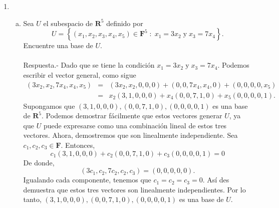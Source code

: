 \begin{enumerate}[\bfseries 1.]
\begin{enumerate}[(a)]
	\end{enumerate}

    \item 
	\begin{enumerate}[a).]

	    \item Sea $U$ el subespacio de $\textbf{R}^5$ definido por
	    $$U=\left\{(x_1,x_2,x_3,x_4,x_5)\in \textbf{F}^5\; : \; x_1=3x_2\;\mbox{y}\; x_3=7x_4\right\}.$$
	    Encuentre una base de $U$.\\\\
		Respuesta.-\; Dado que se tiene la condición $x_1=3x_2\;\mbox{y}\; x_3=7x_4$. Podemos escribir el vector general, como sigue
		$$
		\begin{array}{rcl}
		    (3x_2,x_2,7x_4,x_4,x_5) &=& (3x_2,x_2,0,0,0)+(0,0,7x_4,x_4,0)+(0,0,0,0,x_5)\\
					  &=& x_2(3,1,0,0,0)+x_4(0,0,7,1,0)+x_5(0,0,0,0,1).
		\end{array}
		$$
		Supongamos que $(3,1,0,0,0),(0,0,7,1,0),(0,0,0,0,1)$ es una base de $\textbf{R}^5$. Podemos demostrar fácilmente que estos vectores generar $U$, ya que $U$ puede expresarse como una combinación lineal de estos tres vectores. Ahora, demostremos que son linealmente independiente. Sea $c_1,c_2,c_3\in \textbf{F}$. Entonces, 
		$$c_1(3,1,0,0,0)+c_2(0,0,7,1,0)+c_3(0,0,0,0,1)=0$$
		De donde,
		$$(3c_1,c_2,7c_2,c_2,c_3)=(0,0,0,0,0).$$
		Igualando cada componente, tenemos que $c_1=c_2=c_3=0$. Así des demuestra que estos tres vectores son linealmente independientes. Por lo tanto, $(3,1,0,0,0),(0,0,7,1,0),(0,0,0,0,1)$ es una base de $U$.\\\\


\end{enumerate}
\end{enumerate}
